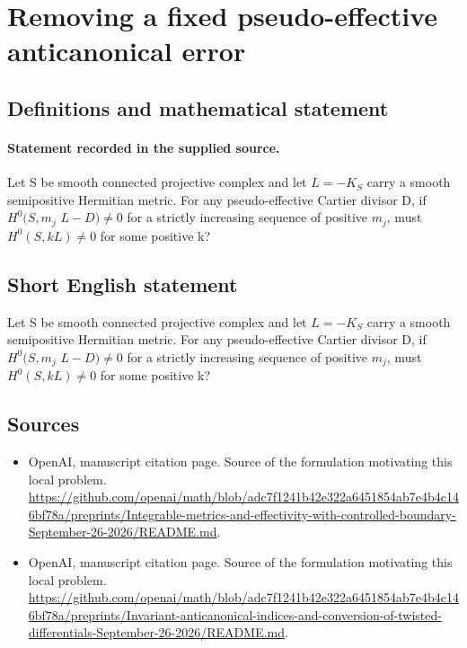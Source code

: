 \documentclass[11pt]{article}
\begin{document}
\section*{Removing a fixed pseudo-effective anticanonical error}\label{30007063}
\subsection{Definitions and mathematical statement}
\paragraph{Statement recorded in the supplied source.}
Let S be smooth connected projective complex and let $L=-K_S$ carry a smooth semipositive Hermitian metric. For any pseudo-effective Cartier divisor D, if $H^{0}(S,m_j$ $L-D)\neq 0$ for a strictly increasing sequence of positive $m_j$, must $H^{0}(S,kL)\neq 0$ for some positive k?
\subsection{Short English statement}
Let S be smooth connected projective complex and let $L=-K_S$ carry a smooth semipositive Hermitian metric. For any pseudo-effective Cartier divisor D, if $H^{0}(S,m_j$ $L-D)\neq 0$ for a strictly increasing sequence of positive $m_j$, must $H^{0}(S,kL)\neq 0$ for some positive k?
\subsection{Sources}
\begin{itemize}
\item[S1] OpenAI, manuscript citation page. Source of the formulation motivating this local problem.
\url{https://github.com/openai/math/blob/adc7f1241b42e322a6451854ab7e4b4c146bf78a/preprints/Integrable-metrics-and-effectivity-with-controlled-boundary-September-26-2026/README.md}.
\item[S2] OpenAI, manuscript citation page. Source of the formulation motivating this local problem.
\url{https://github.com/openai/math/blob/adc7f1241b42e322a6451854ab7e4b4c146bf78a/preprints/Invariant-anticanonical-indices-and-conversion-of-twisted-differentials-September-26-2026/README.md}.
\end{itemize}
\end{document}

